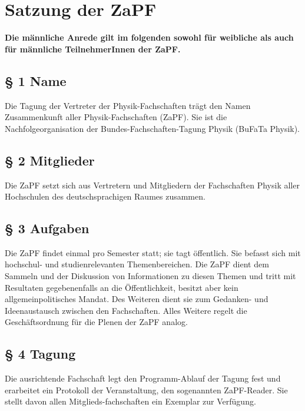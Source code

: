 



\chapter*{Satzung der ZaPF}

\textbf{Die männliche Anrede gilt im folgenden sowohl für weibliche
als auch für männliche
 TeilnehmerInnen der ZaPF.}

\section*{§ 1 Name}
Die Tagung der Vertreter der Physik-Fachschaften trägt den Namen Zusammenkunft aller
Physik-Fachschaften (ZaPF). Sie ist die Nachfolgeorganisation der Bundes-Fachschaften-Tagung Physik
(BuFaTa Physik).

\section*{§ 2 Mitglieder}
Die ZaPF setzt sich aus Vertretern und Mitgliedern der Fachschaften Physik aller Hochschulen
des deutschsprachigen Raumes zusammen.

\section*{§ 3 Aufgaben}
Die ZaPF findet einmal pro Semester statt; sie tagt öffentlich. Sie befasst sich mit
hochschul- und studienrelevanten Themenbereichen. Die ZaPF dient dem Sammeln und der Diskussion von Informationen
zu diesen Themen und tritt mit Resultaten gegebenenfalls an die Öffentlichkeit, besitzt aber kein allgemeinpolitisches
Mandat. Des Weiteren dient sie zum Gedanken- und Ideenaustausch zwischen den Fachschaften. Alles Weitere regelt die
Geschäftsordnung für die Plenen der ZaPF analog.

\section*{§ 4 Tagung}
Die ausrichtende Fachschaft legt den Programm-Ablauf der Tagung fest und erarbeitet ein Protokoll der Veranstaltung,
den sogenannten ZaPF-Reader. Sie stellt davon allen Mitglieds-fachschaften ein Exemplar zur Verfügung.
\newpage
